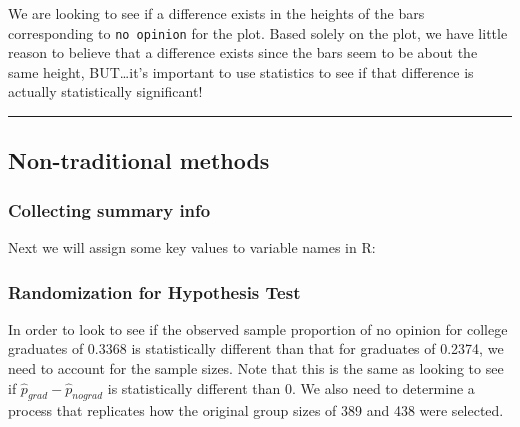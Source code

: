 \documentclass[]{tufte-book}
\newenvironment{Shaded}{\begin{snugshade}}{\end{snugshade}}
\newcommand{\DecValTok}[1]{\textcolor[rgb]{0.00,0.00,0.81}{{#1}}}
\newcommand{\StringTok}[1]{\textcolor[rgb]{0.31,0.60,0.02}{{#1}}}
\newcommand{\NormalTok}[1]{{#1}}
\let\oldrule=\rule
\renewcommand{\rule}[1]{\oldrule{\linewidth}}
\theoremstyle{definition}
\theoremstyle{definition}
\theoremstyle{remark}
\begin{document}
We are looking to see if a difference exists in the heights of the bars
corresponding to \texttt{no\ opinion} for the plot. Based solely on the
plot, we have little reason to believe that a difference exists since
the bars seem to be about the same height, BUT\ldots{}it's important to
use statistics to see if that difference is actually statistically
significant!

\begin{center}\rule{0.5\linewidth}{\linethickness}\end{center}

\subsection{Non-traditional methods}\label{non-traditional-methods-2}

\subsubsection{Collecting summary info}\label{collecting-summary-info}

Next we will assign some key values to variable names in R:

\begin{Shaded}
\end{Shaded}

\subsubsection{Randomization for Hypothesis
Test}\label{randomization-for-hypothesis-test}

In order to look to see if the observed sample proportion of no opinion
for college graduates of 0.3368 is statistically different than that for
graduates of 0.2374, we need to account for the sample sizes. Note that
this is the same as looking to see if
\(\hat{p}_{grad} - \hat{p}_{nograd}\) is statistically different than 0.
We also need to determine a process that replicates how the original
group sizes of 389 and 438 were selected.
\end{document}
